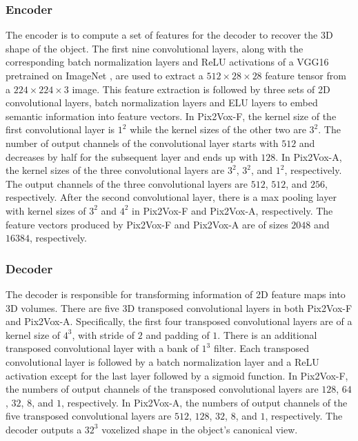 \documentclass[10pt,twocolumn,letterpaper]{article}
\begin{document}
\subsubsection{Encoder}
\vspace{-1 mm}
The encoder is to compute a set of features for the decoder to recover the 3D shape of the object.
The first nine convolutional layers, along with the corresponding batch normalization layers and ReLU activations of a VGG16 \cite{DBLP:conf/iclr/SimonyanZ14a} pretrained on ImageNet \cite{DBLP:conf/cvpr/DengDSLL009}, are used to extract a $512 \times 28 \times 28$ feature tensor from a $224 \times 224 \times 3$ image.
This feature extraction is followed by three sets of 2D convolutional layers, batch normalization layers and ELU layers to embed semantic information into feature vectors.
In Pix2Vox-F, the kernel size of the first convolutional layer is $1^2$ while the kernel sizes of the other two are $3^2$.
The number of output channels of the convolutional layer starts with $512$ and decreases by half for the subsequent layer and ends up with $128$.
In Pix2Vox-A, the kernel sizes of the three convolutional layers are $3^2$, $3^2$, and $1^2$, respectively.
The output channels of the three convolutional layers are $512$, $512$, and $256$, respectively.
After the second convolutional layer, there is a max pooling layer with kernel sizes of $3^2$ and $4^2$ in Pix2Vox-F and Pix2Vox-A, respectively.
The feature vectors produced by Pix2Vox-F and Pix2Vox-A are of sizes $2048$ and $16384$, respectively.
 
\vspace{-3 mm}
\subsubsection{Decoder}
\vspace{-1 mm}
The decoder is responsible for transforming information of 2D feature maps into 3D volumes.
There are five 3D transposed convolutional layers in both Pix2Vox-F and Pix2Vox-A.
Specifically, the first four transposed convolutional layers are of a kernel size of $4^3$, with stride of $2$ and padding of $1$.
There is an additional transposed convolutional layer with a bank of $1^3$ filter.
Each transposed convolutional layer is followed by a batch normalization layer and a ReLU activation except for the last layer followed by a sigmoid function.
In Pix2Vox-F, the numbers of output channels of the transposed convolutional layers are $128$, $64$, $32$, $8$, and $1$, respectively.
In Pix2Vox-A, the numbers of output channels of the five transposed convolutional layers are $512$, $128$, $32$, $8$, and $1$, respectively.
The decoder outputs a $32^3$ voxelized shape in the object's canonical view.
\end{document}
